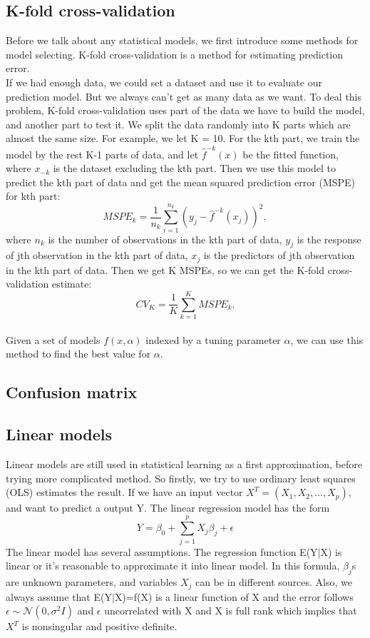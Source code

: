 \documentclass[11pt]{article}
\begin{document}
\subsection{K-fold cross-validation}
Before we talk about any statistical models, we first introduce some methods for model selecting. K-fold cross-validation is a method for estimating prediction error. \\
If we had enough data, we could set a dataset and use it to evaluate our prediction model. But we always can't get as many data as we want. To deal this problem, K-fold cross-validation uses part of the data we have to build the model, and another part to test it. We split the data randomly into K parts which are almost the same size. For example, we let K = 10. For the kth part, we train the model by the rest K-1 parts of data, and let $\hat{f}^{-k}(x)$ be the fitted function, where $x_{-k}$ is the dataset excluding the kth part. Then we use this model to predict the kth part of data and get the mean squared prediction error (MSPE) for kth part:$$MSPE_k = \frac{1}{n_k} \sum_{i=1}^{n_k} (y_j - \hat{f}^{-k}(x_j))^2,$$ where $n_k$ is the number of observations in the kth part of data, $y_j$ is the response of jth observation in the kth part of data, $x_j$ is the predictors of jth observation in the kth part of data. Then we get K MSPEs, so we can get the K-fold cross-validation estimate: $$CV_{K} = \frac{1}{K} \sum_{k=1}^{K} MSPE_k.$$ \\
Given a set of models $f(x, \alpha)$ indexed by a tuning parameter $\alpha$, we can use this method to find the best value for $\alpha$.

\subsection{Confusion matrix}


\subsection{Linear models}  
Linear models are still used in statistical learning as a first approximation, before trying more complicated method. So firstly, we try to use ordinary least squares (OLS) estimates the result. If we have an input vector $X^T=(X_1,X_2,...,X_p)$, and want to predict a output Y. The linear regression model has the form $$Y=\beta_0+\sum_{j=1}^{p} X_j\beta_j + \epsilon$$
The linear model has several assumptions. The regression function E(Y$\mid$X) is linear or it's reasonable to approximate it into linear model. In this formula, $\beta_j$s are unknown parameters, and variables $X_j$ can be in different sources.  
Also, we always assume that E(Y$\mid$X)=f(X) is a linear function of X and the error follows $\epsilon \sim \mathcal N(0, \sigma^2I)$ and $\epsilon$ uncorrelated with X and X is full rank which implies that $X^T$ is nonsingular and positive definite.
\end{document}
